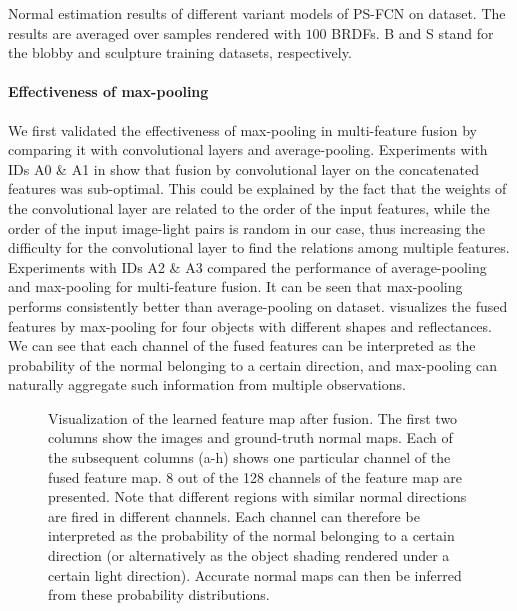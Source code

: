 \begin{table}[htbp] \centering
    \caption[Normal estimation results of PS-FCN on \syntestMERL dataset]{Normal estimation results of different variant models of PS-FCN on \syntestMERL dataset. The results are averaged over samples rendered with $100$ BRDFs. B and S stand for the blobby and sculpture training datasets, respectively.} 
     \label{tab:quant_calib_normal_syn}
\end{table}

\paragraph{Effectiveness of max-pooling} We first validated the effectiveness of max-pooling in multi-feature fusion by comparing it with convolutional layers and average-pooling. 
Experiments with IDs A0 \& A1 in  show that fusion by convolutional layer on the concatenated features was sub-optimal. This could be explained by the fact that the weights of the convolutional layer are related to the order of the input features, while the order of the input image-light pairs is random in our case, thus increasing the difficulty for the convolutional layer to find the relations among multiple features. 
Experiments with IDs A2 \& A3 compared the performance of average-pooling and max-pooling for multi-feature fusion. It can be seen that max-pooling performs consistently better than average-pooling on \syntestMERL dataset.
 visualizes the fused features by max-pooling for four objects with different shapes and reflectances. We can see that each channel of the fused features can be interpreted as the probability of the normal belonging to a certain direction, and max-pooling can naturally aggregate such information from multiple observations.

\begin{figure}[htbp]
\centering
    
    \caption[Visualization of the learned feature map after fusion]{Visualization of the learned feature map after fusion. The first two columns show the images and ground-truth normal maps. Each of the subsequent columns (a-h) shows one particular channel of the fused feature map. 8 out of the 128 channels of the feature map are presented. Note that different regions with similar normal directions are fired in different channels. Each channel can therefore be interpreted as the probability of the normal belonging to a certain direction (or alternatively as the object shading rendered under a certain light direction). Accurate normal maps can then be inferred from these probability distributions.} \label{fig:res_visual}
\end{figure}

